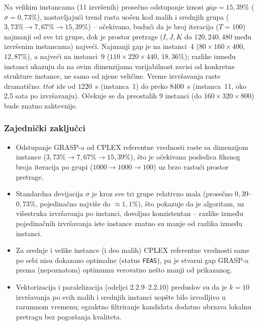 \documentclass[12pt,a4paper]{article}
\begin{document}
Na velikim instancama (11 izvršenih) prosečno odstupanje iznosi
$\overline{gap} = 15{,}39\%$ ($\sigma = 0{,}73\%$), nastavljajući trend rasta
uočen kod malih i srednjih grupa ($3{,}73\% \to 7{,}67\% \to 15{,}39\%$) --
očekivano, budući da je broj iteracija ($T=100$) najmanji od sve tri grupe,
dok je prostor pretrage ($I,J,K$ do $120,240,480$ među izvršenim instancama)
najveći. Najmanji gap je na instanci~4 ($80\times160\times400$, $12{,}87\%$),
a najveći na instanci~9 ($110\times220\times440$, $18{,}36\%$); razlike između
instanci ukazuju da na ovim dimenzijama varijabilnost zavisi od konkretne
strukture instance, ne samo od njene veličine. Vreme izvršavanja raste
dramatično: $\overline{ttot}$ ide od $1220$~s (instanca~1) do preko $8400$~s
(instanca~11, oko 2,5 sata po izvršavanju). Očekuje se da preostalih 9
instanci (do $160 \times 320 \times 800$) bude znatno zahtevnije.

\subsubsection{Zajednički zaključci}

\begin{itemize}
  \item Odstupanje GRASP-a od CPLEX referentne vrednosti raste sa dimenzijom
    instance ($3{,}73\% \to 7{,}67\% \to 15{,}39\%$), što je očekivana
    posledica fiksnog broja iteracija po grupi ($1000 \to 1000 \to 100$) uz
    brzo rastući prostor pretrage.
  \item Standardna devijacija $\sigma$ je kroz sve tri grupe relativno mala
    (prosečno $0{,}39$--$0{,}73\%$, pojedinačno najviše do $\approx 1{,}1\%$),
    što pokazuje da je algoritam, uz višestruka izvršavanja po instanci,
    dovoljno konzistentan -- razlike između pojedinačnih izvršavanja iste
    instance znatno su manje od razlika između instanci.
  \item Za srednje i velike instance (i deo malih) CPLEX referentne vrednosti
    same po sebi nisu dokazano optimalne (status \texttt{FEAS}), pa je stvarni
    gap GRASP-a prema (nepoznatom) optimumu verovatno nešto manji od
    prikazanog.
  \item Vektorizacija i paralelizacija (odeljci 2.2.9--2.2.10) preduslov su da
    je $k=10$ izvršavanja po svih malih i srednjih instanci uopšte bilo
    izvodljivo u razumnom vremenu; egzaktno filtriranje kandidata dodatno
    ubrzava lokalnu pretragu bez pogoršanja kvaliteta.
\end{itemize}
\end{document}
